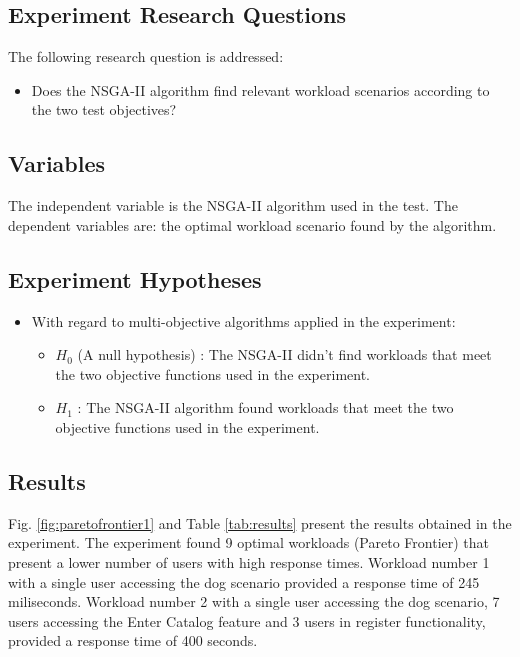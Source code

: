 \documentclass[espaco=umemeio,chapter=TITLE,twoside,openright]{abnt}
\begin{document}
\subsection{Experiment Research Questions}

The following research question is addressed:
\begin{itemize}
\item Does the NSGA-II algorithm find relevant workload scenarios according to the two test objectives?
\end{itemize}

\subsection{Variables}

The independent variable is the NSGA-II algorithm used in the test. The dependent variables are: the optimal workload scenario found by the algorithm.

\subsection{Experiment Hypotheses}

\begin{itemize}
\item With regard to multi-objective algorithms applied in the experiment:
\begin{itemize}
\item $H_{0}$ (A null hypothesis) : The NSGA-II didn't find workloads that meet the two objective functions used in the experiment.
\item $H_{1}$  : The NSGA-II  algorithm found workloads that meet the two objective functions used in the experiment.
\end{itemize}
\end{itemize}


\subsection{Results}

Fig. \ref{fig:paretofrontier1} and Table \ref{tab:results} present the results obtained in the experiment. The experiment found 9 optimal workloads (Pareto Frontier) that present a lower number of users with high response times. Workload number 1 with a single user accessing the dog scenario provided a response time of 245 miliseconds.  Workload number 2 with a single user accessing the dog scenario, 7 users accessing the Enter Catalog feature and 3 users in register functionality, provided a response time of 400 seconds.
\end{document}
